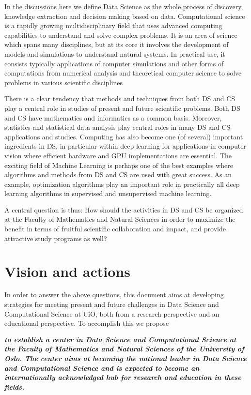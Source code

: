 \documentclass[a4paper,10pt]{article}
\begin{document}
In the discussions here we define Data Science as the whole process of discovery, knowledge extraction and decision making based on data.
Computational science  is a rapidly growing multidisciplinary field that uses advanced computing capabilities to understand and solve complex problems. It is an area of science which spans many disciplines, but at its core it involves the development of models and simulations to understand natural systems. In practical use, it consists  typically applications of computer simulations and other forms of computations from numerical analysis and theoretical computer science to solve problems in various scientific disciplines

There is a clear tendency that methods and techniques from both DS and CS play a central role in  studies of present and future scientific problems.  Both DS and CS have mathematics and informatics as a common basis. Moreover, statistics and statistical data analysis  play central roles in many DS and CS applications and studies.  Computing has
also become one (of several) important ingredients in DS, in particular  within deep
learning for applications in computer vision where efficient hardware and GPU implementations
are  essential. The  exciting   field  of  Machine  Learning  is  perhaps  one  of  the  best  examples
where algorithms and methods from DS and CS are used with great success.  As an example, optimization algorithms play an important role in practically  all deep learning algorithms in supervised and unsupervised machine learning. 

A central question is thus: 
How should the activities in DS and CS be organized at the Faculty of Mathematics and Natural Sciences in order to maximize the benefit in terms of fruitful scientific collaboration and impact, and provide attractive study programs as well?


\section{Vision and actions}

In order to answer the above questions, 
this document aims at developing strategies for meeting  present and future challenges in Data Science  and Computational Science at UiO, both from a research perspective and an educational perspective. To accomplish this we propose\newline 

{\bf \em to establish a center in  Data Science and Computational Science at the Faculty of Mathematics and Natural Sciences of the University of Oslo. The center aims at becoming the national leader in Data Science and Computational Science and is expected to become an internationally acknowledged hub for research and education in these fields.}
\end{document}
